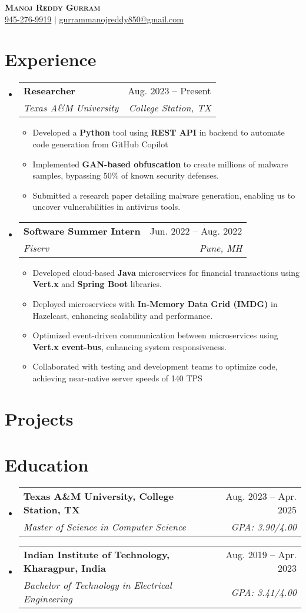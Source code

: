 \documentclass[letterpaper,10pt]{article}
\makeatletter
\newcommand{\resumeItem}[1]{
  \item\small{
    {#1 \vspace{-2pt}}
  }
}
\newcommand{\resumeSubheading}[4]{
  \vspace{-2pt}\item
    \begin{tabular*}{0.97\textwidth}[t]{l@{\extracolsep{\fill}}r}
      \textbf{#1} & #2 \\
      \textit{\small#3} & \textit{\small #4} \\
    \end{tabular*}\vspace{-7pt}
}
\newcommand{\resumeSubHeadingListStart}{\begin{itemize}[leftmargin=0.15in, label={}]}
\newcommand{\resumeSubHeadingListEnd}{\end{itemize}}
\newcommand{\resumeItemListStart}{\begin{itemize}}
\newcommand{\resumeItemListEnd}{\end{itemize}\vspace{-5pt}}
\makeatother
\begin{document}
\begin{center}
    \textbf{\Huge \scshape Manoj Reddy Gurram} \\ \vspace{1pt}
    \small \underline{945-276-9919} $|$ \underline{gurrammanojreddy850@gmail.com}
\end{center}


\section{Experience}
  \resumeSubHeadingListStart

    \resumeSubheading
      {Researcher}{Aug. 2023 -- Present}
      {Texas A\&M University}{College Station, TX}
      \resumeItemListStart
        \resumeItem{Developed a \textbf{Python} tool using \textbf{REST API} in backend to automate code generation from GitHub Copilot}
        \resumeItem{Implemented \textbf{GAN-based obfuscation} to create millions of malware samples, bypassing 50\% of known security defenses.}
        \resumeItem{Submitted a research paper detailing malware generation, enabling us to uncover vulnerabilities in antivirus tools.}
    \resumeItemListEnd

    \resumeSubheading
      {Software Summer Intern}{Jun. 2022 -- Aug. 2022}
      {Fiserv}{Pune, MH}
      \resumeItemListStart
        \resumeItem{Developed cloud-based \textbf{Java} microservices for financial transactions using \textbf{Vert.x} and \textbf{Spring Boot} libraries.}
        \resumeItem{Deployed microservices with \textbf{In-Memory Data Grid (IMDG)} in Hazelcast, enhancing scalability and performance.}
        \resumeItem{Optimized event-driven communication between microservices using \textbf{Vert.x event-bus}, enhancing system responsiveness.}
        \resumeItem{Collaborated with testing and development teams to optimize code, achieving near-native server speeds of 140 TPS}
      \resumeItemListEnd

  \resumeSubHeadingListEnd

\section{Projects}
  \resumeSubHeadingListStart

  \resumeSubHeadingListEnd
\section{Education}
  \resumeSubHeadingListStart
    \resumeSubheading
      {Texas A\&M University, College Station, TX}{Aug. 2023 -- Apr. 2025}
      {Master of Science in Computer Science}{GPA: 3.90/4.00}
    \resumeSubheading
      {Indian Institute of Technology, Kharagpur, India}{Aug. 2019 -- Apr. 2023}
      {Bachelor of Technology in Electrical Engineering}{GPA: 3.41/4.00}
  \resumeSubHeadingListEnd
\vspace{-5pt}
\end{document}
